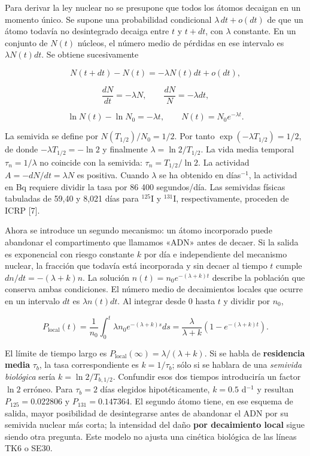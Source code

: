 \documentclass[11pt,a4paper,oneside]{article}
\begin{document}
Para derivar la ley nuclear no se presupone que todos los átomos decaigan en un momento único. Se supone una probabilidad condicional \(\lambda\,dt+o(dt)\) de que un átomo todavía no desintegrado decaiga entre \(t\) y \(t+dt\), con \(\lambda\) constante. En un conjunto de \(N(t)\) núcleos, el número medio de pérdidas en ese intervalo es \(\lambda N(t)dt\). Se obtiene sucesivamente

\[N(t+dt)-N(t)=-\lambda N(t)dt+o(dt),\]

\[\frac{dN}{dt}=-\lambda N,\qquad \frac{dN}{N}=-\lambda dt,\]

\[\ln N(t)-\ln N_0=-\lambda t,\qquad N(t)=N_0e^{-\lambda t}.\]

La semivida se define por \(N(T_{1/2})/N_0=1/2\). Por tanto \(\exp(-\lambda T_{1/2})=1/2\), de donde \(-\lambda T_{1/2}=-\ln2\) y finalmente \(\lambda=\ln2/T_{1/2}\). La vida media temporal \(\tau_n=1/\lambda\) no coincide con la semivida: \(\tau_n=T_{1/2}/\ln2\). La actividad \(A=-dN/dt=\lambda N\) es positiva. Cuando \(\lambda\) se ha obtenido en días\(^{-1}\), la actividad en Bq requiere dividir la tasa por 86 400 segundos/día. Las semividas físicas tabuladas de 59,40 y 8,021 días para \(^{125}\)I y \(^{131}\)I, respectivamente, proceden de ICRP {[}7{]}.

Ahora se introduce un segundo mecanismo: un átomo incorporado puede abandonar el compartimento que llamamos «ADN» antes de decaer. Si la salida es exponencial con riesgo constante \(k\) por día e independiente del mecanismo nuclear, la fracción que todavía está incorporada y sin decaer al tiempo \(t\) cumple \(dn/dt=-(\lambda+k)n\). La solución \(n(t)=n_0e^{-(\lambda+k)t}\) describe la población que conserva ambas condiciones. El número medio de decaimientos locales que ocurre en un intervalo \(dt\) es \(\lambda n(t)dt\). Al integrar desde 0 hasta \(t\) y dividir por \(n_0\),

\[P_{\mathrm{local}}(t)=\frac{1}{n_0}\int_0^t\lambda n_0e^{-(\lambda+k)s}ds
=\frac{\lambda}{\lambda+k}\left(1-e^{-(\lambda+k)t}\right).\]

El límite de tiempo largo es \(P_{\mathrm{local}}(\infty)=\lambda/(\lambda+k)\). Si se habla de \textbf{residencia media} \(\tau_b\), la tasa correspondiente es \(k=1/\tau_b\); sólo si se hablara de una \emph{semivida biológica} sería \(k=\ln2/T_{b,1/2}\). Confundir esos dos tiempos introduciría un factor \(\ln2\) erróneo. Para \(\tau_b=2\) días elegidos hipotéticamente, \(k=0.5\) d\(^{-1}\) y resultan \(P_{125}=0.022806\) y \(P_{131}=0.147364\). El segundo átomo tiene, en ese esquema de salida, mayor posibilidad de desintegrarse antes de abandonar el ADN por su semivida nuclear más corta; la intensidad del daño \textbf{por decaimiento local} sigue siendo otra pregunta. Este modelo no ajusta una cinética biológica de las líneas TK6 o SE30.
\end{document}
